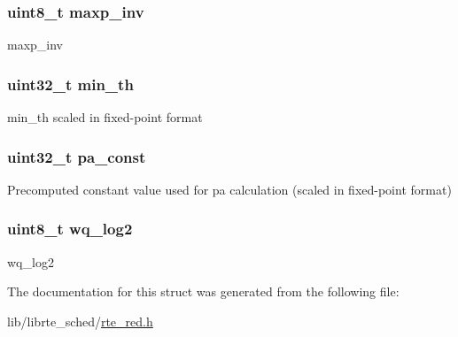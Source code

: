 \subsubsection[{maxp\+\_\+inv}]{\setlength{\rightskip}{0pt plus 5cm}uint8\+\_\+t maxp\+\_\+inv}\label{structrte__red__config_a2b8cd8fd103afdd931eac30db9d5c560}
maxp\+\_\+inv \hypertarget{structrte__red__config_a34a00988a15f859e28d685331d6b33bc}{}
\subsubsection[{min\+\_\+th}]{\setlength{\rightskip}{0pt plus 5cm}uint32\+\_\+t min\+\_\+th}\label{structrte__red__config_a34a00988a15f859e28d685331d6b33bc}
min\+\_\+th scaled in fixed-\/point format \hypertarget{structrte__red__config_a00a8a586c47354f82da115ac241ca013}{}
\subsubsection[{pa\+\_\+const}]{\setlength{\rightskip}{0pt plus 5cm}uint32\+\_\+t pa\+\_\+const}\label{structrte__red__config_a00a8a586c47354f82da115ac241ca013}
Precomputed constant value used for pa calculation (scaled in fixed-\/point format) \hypertarget{structrte__red__config_a23f07bc6f30cea0b2d93a91578b528c5}{}
\subsubsection[{wq\+\_\+log2}]{\setlength{\rightskip}{0pt plus 5cm}uint8\+\_\+t wq\+\_\+log2}\label{structrte__red__config_a23f07bc6f30cea0b2d93a91578b528c5}
wq\+\_\+log2 

The documentation for this struct was generated from the following file\+:\begin{DoxyCompactItemize}
\item 
lib/librte\+\_\+sched/\hyperlink{rte__red_8h}{rte\+\_\+red.\+h}\end{DoxyCompactItemize}

